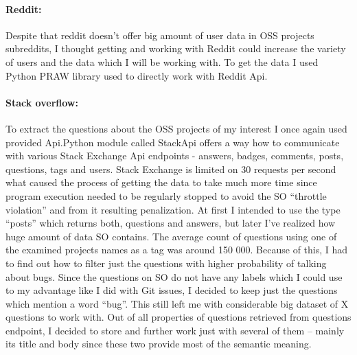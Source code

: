 \paragraph{Reddit:}
Despite that reddit doesn't offer big amount of user data in OSS projects subreddits, I thought getting and working with Reddit could increase the variety of users and the data which I will be working with. To get the data I used Python PRAW library used to directly work with Reddit Api. 

\paragraph{Stack overflow:}
To extract the questions about the OSS projects of my interest I once again used provided Api.Python module called StackApi offers a way how to communicate with various Stack Exchange Api endpoints - answers, badges, comments, posts, questions, tags and users.  Stack Exchange is limited on 30 requests per second what caused the process of getting the data to take much more time since program execution needed to be regularly stopped to avoid the SO “throttle violation” and from it resulting penalization. At first I intended to use the type “posts” which returns both, questions and answers, but later I've realized how huge amount of data SO contains.  The average count of questions using one of the examined projects names as a tag was around 150 000. Because of this, I had to find out how to filter just the questions with higher probability of talking about bugs. Since the questions on SO do not have any labels which I could use to my advantage like I did with Git issues, I decided to keep just the questions which mention a word “bug”. This still left me with considerable big dataset of X questions to work with. Out of all properties of questions retrieved from questions endpoint, I decided to store and further work just with several of them – mainly its title and body since these two provide most of the semantic meaning.